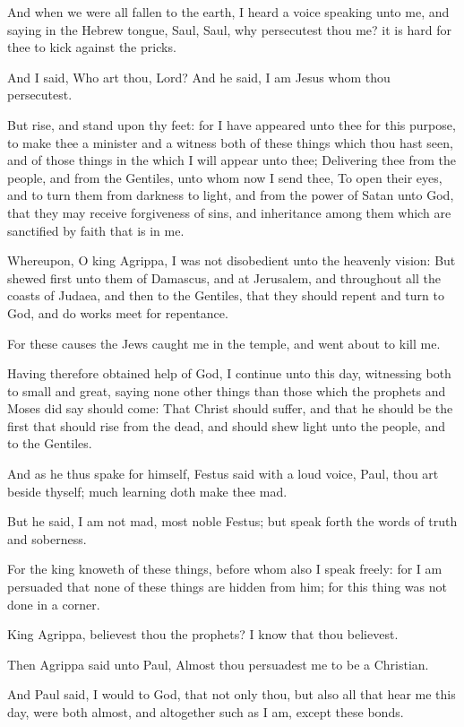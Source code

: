\Verse And when we were all fallen to the earth, I heard a voice speaking unto me, and saying in the Hebrew tongue, Saul, Saul, why persecutest thou me? it is hard for thee to kick against the pricks.

\Verse And I said, Who art thou, Lord? And he said, I am Jesus whom thou persecutest.

\Verse But rise, and stand upon thy feet: for I have appeared unto thee for this purpose, to make thee a minister and a witness both of these things which thou hast seen, and of those things in the which I will appear unto thee; \Verse Delivering thee from the people, and from the Gentiles, unto whom now I send thee, \Verse To open their eyes, and to turn them from darkness to light, and from the power of Satan unto God, that they may receive forgiveness of sins, and inheritance among them which are sanctified by faith that is in me.

\Verse Whereupon, O king Agrippa, I was not disobedient unto the heavenly vision: \Verse But shewed first unto them of Damascus, and at Jerusalem, and throughout all the coasts of Judaea, and then to the Gentiles, that they should repent and turn to God, and do works meet for repentance.

\Verse For these causes the Jews caught me in the temple, and went about to kill me.

\Verse Having therefore obtained help of God, I continue unto this day, witnessing both to small and great, saying none other things than those which the prophets and Moses did say should come: \Verse That Christ should suffer, and that he should be the first that should rise from the dead, and should shew light unto the people, and to the Gentiles.

\Verse And as he thus spake for himself, Festus said with a loud voice, Paul, thou art beside thyself; much learning doth make thee mad.

\Verse But he said, I am not mad, most noble Festus; but speak forth the words of truth and soberness.

\Verse For the king knoweth of these things, before whom also I speak freely: for I am persuaded that none of these things are hidden from him; for this thing was not done in a corner.

\Verse King Agrippa, believest thou the prophets? I know that thou believest.

\Verse Then Agrippa said unto Paul, Almost thou persuadest me to be a Christian.

\Verse And Paul said, I would to God, that not only thou, but also all that hear me this day, were both almost, and altogether such as I am, except these bonds.

